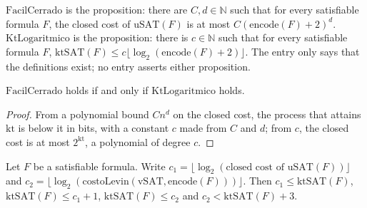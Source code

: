 \begin{definition}
  \label{def:information-sat-easy}
  \leanok
  $\mathrm{FacilCerrado}$ is the proposition: there are $C, d \in \mathbb{N}$ such that for every
  satisfiable formula $F$, the closed cost of $\mathrm{uSAT}(F)$ is at most
  $C (\mathrm{encode}(F) + 2)^d$. $\mathrm{KtLogaritmico}$ is the proposition: there is
  $c \in \mathbb{N}$ such that for every satisfiable formula $F$,
  $\mathrm{ktSAT}(F) \le c \lfloor \log_2 (\mathrm{encode}(F) + 2) \rfloor$. The entry only says that
  the definitions exist; no entry asserts either proposition.
  \own{}
\end{definition}

\begin{theorem}
  \label{thm:information-sat-easy-iff-kt}
  \leanok
  $\mathrm{FacilCerrado}$ holds if and only if $\mathrm{KtLogaritmico}$ holds.
  \own{}
\end{theorem}

\begin{proof}
  \leanok
  From a polynomial bound $C n^d$ on the closed cost, the process that attains $\mathrm{kt}$ is
  below it in bits, with a constant $c$ made from $C$ and $d$; from $c$, the closed cost is at most
  $2^{\mathrm{kt}}$, a polynomial of degree $c$.
\end{proof}

\begin{theorem}
  \label{thm:information-sat-law}
  \leanok
  Let $F$ be a satisfiable formula. Write $c_1 = \lfloor \log_2 (\text{closed cost of }
  \mathrm{uSAT}(F)) \rfloor$ and $c_2 = \lfloor \log_2 (\mathrm{costoLevin}(\mathrm{vSAT},
  \mathrm{encode}(F))) \rfloor$. Then $c_1 \le \mathrm{ktSAT}(F)$, $\mathrm{ktSAT}(F) \le c_1 + 1$,
  $\mathrm{ktSAT}(F) \le c_2$ and $c_2 < \mathrm{ktSAT}(F) + 3$.
  \own{}
\end{theorem}

